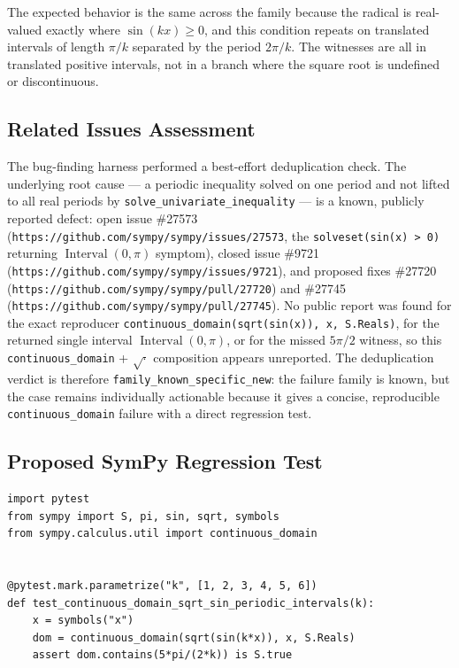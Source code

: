 \documentclass[11pt]{article}
\begin{document}
The expected behavior is the same across the family because the radical is
real-valued exactly where \(\sin(kx)\geq 0\), and this condition repeats on
translated intervals of length \(\pi/k\) separated by the period \(2\pi/k\).
The witnesses are all in translated positive intervals, not in a branch where
the square root is undefined or discontinuous.

\subsection{Related Issues Assessment}

The bug-finding harness performed a best-effort deduplication check. The
underlying root cause --- a periodic inequality solved on one period and not
lifted to all real periods by \texttt{solve\_univariate\_inequality} --- is a
known, publicly reported defect: open issue \#27573
(\nolinkurl{https://github.com/sympy/sympy/issues/27573}, the
\texttt{solveset(sin(x) > 0)} returning \(\operatorname{Interval}(0,\pi)\)
symptom), closed issue \#9721
(\nolinkurl{https://github.com/sympy/sympy/issues/9721}), and proposed fixes
\#27720 (\nolinkurl{https://github.com/sympy/sympy/pull/27720}) and \#27745
(\nolinkurl{https://github.com/sympy/sympy/pull/27745}). No public report was
found for the exact reproducer
\nolinkurl{continuous_domain(sqrt(sin(x)), x, S.Reals)}, for the returned
single interval \(\operatorname{Interval}(0,\pi)\), or for the missed
\(5\pi/2\) witness, so this \nolinkurl{continuous_domain} + \(\sqrt{\cdot}\)
composition appears unreported. The deduplication verdict is therefore
\texttt{family\_known\_specific\_new}: the failure family is known, but the case
remains individually actionable because it gives a concise, reproducible
\nolinkurl{continuous_domain} failure with a direct regression test.

\subsection{Proposed SymPy Regression Test}

\medskip

\begin{lstlisting}[style=bugpython]
import pytest
from sympy import S, pi, sin, sqrt, symbols
from sympy.calculus.util import continuous_domain


@pytest.mark.parametrize("k", [1, 2, 3, 4, 5, 6])
def test_continuous_domain_sqrt_sin_periodic_intervals(k):
    x = symbols("x")
    dom = continuous_domain(sqrt(sin(k*x)), x, S.Reals)
    assert dom.contains(5*pi/(2*k)) is S.true
\end{lstlisting}
\end{document}
